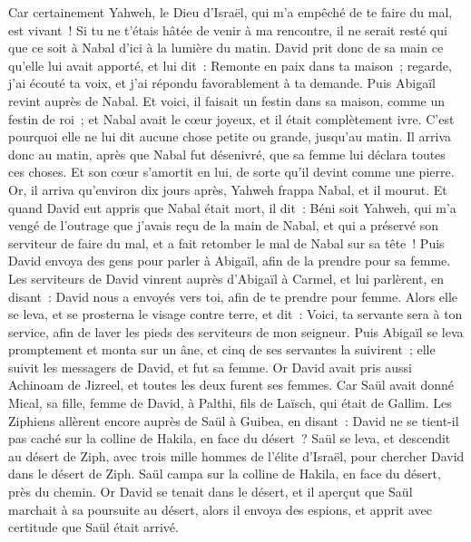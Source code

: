 \begin{multicols}{2}
Car certainement Yahweh, le Dieu d'Israël, qui m'a empêché de te faire du mal, est vivant~! Si tu ne t'étais hâtée de venir à ma rencontre, il ne serait resté qui que ce soit à Nabal d'ici à la lumière du matin.
David prit donc de sa main ce qu'elle lui avait apporté, et lui dit~: Remonte en paix dans ta maison~; regarde, j'ai écouté ta voix, et j'ai répondu favorablement à ta demande.
Puis Abigaïl revint auprès de Nabal. Et voici, il faisait un festin dans sa maison, comme un festin de roi~; et Nabal avait le cœur joyeux, et il était complètement ivre. C'est pourquoi elle ne lui dit aucune chose petite ou grande, jusqu'au matin.
Il arriva donc au matin, après que Nabal fut désenivré, que sa femme lui déclara toutes ces choses. Et son cœur s'amortit en lui, de sorte qu'il devint comme une pierre.
Or, il arriva qu'environ dix jours après, Yahweh frappa Nabal, et il mourut.
Et quand David eut appris que Nabal était mort, il dit~: Béni soit Yahweh, qui m'a vengé de l'outrage que j'avais reçu de la main de Nabal, et qui a préservé son serviteur de faire du mal, et a fait retomber le mal de Nabal sur sa tête~! Puis David envoya des gens pour parler à Abigaïl, afin de la prendre pour sa femme.
Les serviteurs de David vinrent auprès d'Abigaïl à Carmel, et lui parlèrent, en disant~: David nous a envoyés vers toi, afin de te prendre pour femme.
Alors elle se leva, et se prosterna le visage contre terre, et dit~: Voici, ta servante sera à ton service, afin de laver les pieds des serviteurs de mon seigneur.
Puis Abigaïl se leva promptement et monta sur un âne, et cinq de ses servantes la suivirent~; elle suivit les messagers de David, et fut sa femme.
Or David avait pris aussi Achinoam de Jizreel, et toutes les deux furent ses femmes.
Car Saül avait donné Mical, sa fille, femme de David, à Palthi, fils de Laïsch, qui était de Gallim.
\VerseOne{}Les Ziphiens allèrent encore auprès de Saül à Guibea, en disant~: David ne se tient-il pas caché sur la colline de Hakila, en face du désert~?
Saül se leva, et descendit au désert de Ziph, avec trois mille hommes de l'élite d'Israël, pour chercher David dans le désert de Ziph.
Saül campa sur la colline de Hakila, en face du désert, près du chemin. Or David se tenait dans le désert, et il aperçut que Saül marchait à sa poursuite au désert,
alors il envoya des espions, et apprit avec certitude que Saül était arrivé.

\end{multicols}
